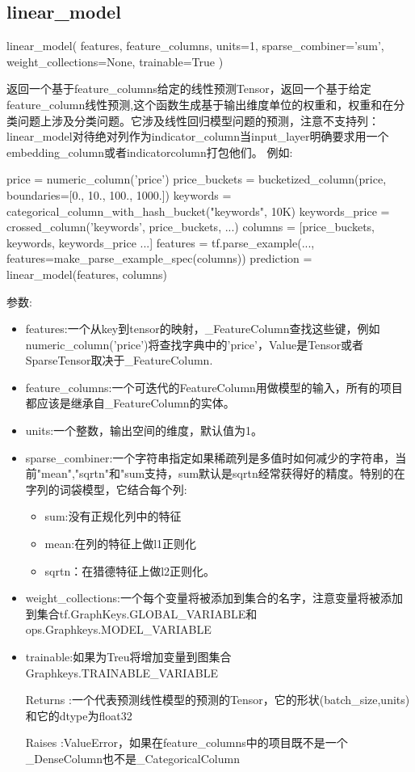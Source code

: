 \subsection{linear\_model}
\begin{python}
linear_model(
    features,
    feature_columns,
    units=1,
    sparse_combiner='sum',
    weight_collections=None,
    trainable=True
)
\end{python}
返回一个基于feature\_columns给定的线性预测Tensor，返回一个基于给定feature\_column线性预测,这个函数生成基于输出维度单位的权重和，权重和在分类问题上涉及分类问题。它涉及线性回归模型问题的预测，注意不支持列：linear\_model对待绝对列作为indicator\_column当input\_layer明确要求用一个embedding\_column或者indicator\-column打包他们。
例如:
\begin{python}
price = numeric_column('price')
price_buckets = bucketized_column(price, boundaries=[0., 10., 100., 1000.])
keywords = categorical_column_with_hash_bucket("keywords", 10K)
keywords_price = crossed_column('keywords', price_buckets, ...)
columns = [price_buckets, keywords, keywords_price ...]
features = tf.parse_example(..., features=make_parse_example_spec(columns))
prediction = linear_model(features, columns)
\end{python}
参数:
\begin{itemize}
	\item features:一个从key到tensor的映射，\_FeatureColumn查找这些键，例如numeric\_column('price')将查找字典中的'price'，Value是Tensor或者SparseTensor取决于\_FeatureColumn.
	\item feature\_columns:一个可迭代的FeatureColumn用做模型的输入，所有的项目都应该是继承自\_FeatureColumn的实体。
	\item units:一个整数，输出空间的维度，默认值为1。
	\item sparse\_combiner:一个字符串指定如果稀疏列是多值时如何减少的字符串，当前"mean","sqrtn"和"sum支持，sum默认是sqrtn经常获得好的精度。特别的在字列的词袋模型，它结合每个列:
	\begin{itemize}
	\item sum:没有正规化列中的特征
	\item mean:在列的特征上做l1正则化
	\item sqrtn：在猎德特征上做l2正则化。
	\end{itemize}
	\item weight\_collections:一个每个变量将被添加到集合的名字，注意变量将被添加到集合tf.GraphKeys.GLOBAL\_VARIABLE和ops.Graphkeys.MODEL\_VARIABLE
	\item trainable:如果为Treu将增加变量到图集合Graphkeys.TRAINABLE\_VARIABLE
	\item[Returns]:一个代表预测线性模型的预测的Tensor，它的形状(batch\_size,units)和它的dtype为float32
	\item[Raises]:ValueError，如果在feature\_columns中的项目既不是一个\_DenseColumn也不是\_CategoricalColumn
\end{itemize}
